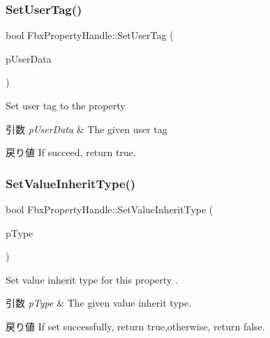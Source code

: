 \subsubsection{\texorpdfstring{Set\+User\+Tag()}{SetUserTag()}}
{\footnotesize\ttfamily bool Fbx\+Property\+Handle\+::\+Set\+User\+Tag (\begin{DoxyParamCaption}\item[{int}]{p\+User\+Data }\end{DoxyParamCaption})}

Set user tag to the property 
\begin{DoxyParams}{引数}
{\em p\+User\+Data} & The given user tag \\
\hline
\end{DoxyParams}
\begin{DoxyReturn}{戻り値}
If succeed, return true. 
\end{DoxyReturn}
\mbox{\label{class_fbx_property_handle_a3f03d6a87ab11bffdd30923485272f4a}} 
\subsubsection{\texorpdfstring{Set\+Value\+Inherit\+Type()}{SetValueInheritType()}}
{\footnotesize\ttfamily bool Fbx\+Property\+Handle\+::\+Set\+Value\+Inherit\+Type (\begin{DoxyParamCaption}\item[{\hyperlink{class_fbx_property_flags_ae3b667a4fcac4b827fa186a698fec2f8}{Fbx\+Property\+Flags\+::\+E\+Inherit\+Type}}]{p\+Type }\end{DoxyParamCaption})}

Set value inherit type for this property . 
\begin{DoxyParams}{引数}
{\em p\+Type} & The given value inherit type. \\
\hline
\end{DoxyParams}
\begin{DoxyReturn}{戻り値}
If set successfully, return true,otherwise, return false. 
\end{DoxyReturn}
\mbox{\label{class_fbx_property_handle_ae9e85fda97a40a94361ed91c6127f5a1}} 
